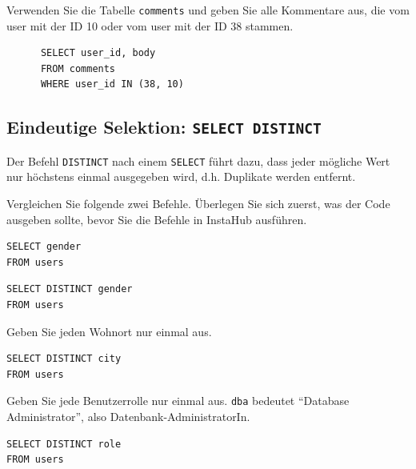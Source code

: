\begin{myexercise}
  Verwenden Sie die Tabelle \texttt{comments} und geben Sie alle Kommentare aus, die vom user mit der ID 10 oder vom user mit der ID 38 stammen.
  \begin{myanswer}
    \begin{lstlisting}
      SELECT user_id, body 
      FROM comments 
      WHERE user_id IN (38, 10)
\end{lstlisting}
  \end{myanswer}
\end{myexercise}


\subsection{Eindeutige Selektion: \texorpdfstring{\lstinline|SELECT DISTINCT|}{SELECT DISTINCT}}

Der Befehl \lstinline|DISTINCT| nach einem \lstinline|SELECT| führt dazu, dass jeder mögliche Wert
nur höchstens einmal ausgegeben wird, d.h. Duplikate werden entfernt.

\begin{myexercise}
  Vergleichen Sie folgende zwei Befehle. Überlegen Sie sich zuerst, was der Code ausgeben sollte, bevor Sie die Befehle in InstaHub ausführen.

 \begin{lstlisting}
SELECT gender
FROM users
\end{lstlisting}

  \begin{lstlisting}
SELECT DISTINCT gender
FROM users
\end{lstlisting}
\end{myexercise}

\begin{myexercise}
  Geben Sie jeden Wohnort nur einmal aus.
  \begin{myanswer}
    \begin{lstlisting}
SELECT DISTINCT city 
FROM users
\end{lstlisting}
  \end{myanswer}
\end{myexercise}
\begin{myexercise}
  Geben Sie jede Benutzerrolle nur einmal aus. \texttt{dba} bedeutet ``Database Administrator'', also Datenbank-AdministratorIn.
  \begin{myanswer}
    \begin{lstlisting}
SELECT DISTINCT role
FROM users
\end{lstlisting}
  \end{myanswer}
\end{myexercise}


